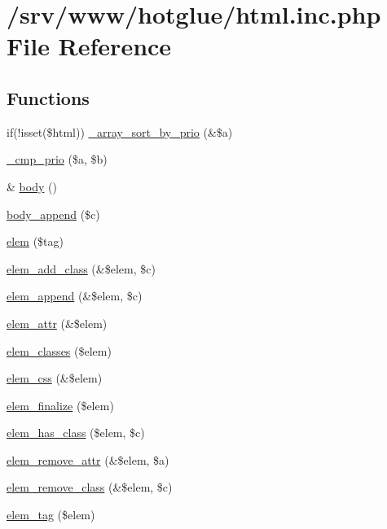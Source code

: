 \hypertarget{html_8inc_8php}{
\section{/srv/www/hotglue/html.inc.php File Reference}
\label{html_8inc_8php}
}
\subsection*{Functions}
\begin{DoxyCompactItemize}
\item 
if(!isset(\$html)) \hyperlink{html_8inc_8php_a7fb2b386b2bae219112628971275c225}{\_\-array\_\-sort\_\-by\_\-prio} (\&\$a)
\item 
\hyperlink{html_8inc_8php_af8ecadff0a4b78867d4da5eae49615e1}{\_\-cmp\_\-prio} (\$a, \$b)
\item 
\& \hyperlink{html_8inc_8php_a8b842636055e9a5853a7a10a9e002330}{body} ()
\item 
\hyperlink{html_8inc_8php_ad27881abf3a2004d287434d8c8d7cdf6}{body\_\-append} (\$c)
\item 
\hyperlink{html_8inc_8php_aa7a1256f84f937f1656195d5ce7b8d91}{elem} (\$tag)
\item 
\hyperlink{html_8inc_8php_aafa12d2b690751666e599fb052e19ca6}{elem\_\-add\_\-class} (\&\$elem, \$c)
\item 
\hyperlink{html_8inc_8php_aea37c451f5d55e2efbb2656e340c1dae}{elem\_\-append} (\&\$elem, \$c)
\item 
\hyperlink{html_8inc_8php_a894dc22f3b7668c59364599909162b8e}{elem\_\-attr} (\&\$elem)
\item 
\hyperlink{html_8inc_8php_a821651b8923938645b0b0fa6bb084522}{elem\_\-classes} (\$elem)
\item 
\hyperlink{html_8inc_8php_ac705ef06deb9e2d49e342ed78ecc1c9a}{elem\_\-css} (\&\$elem)
\item 
\hyperlink{html_8inc_8php_af04b43a4dd09e73ca2cef84a4f2e9381}{elem\_\-finalize} (\$elem)
\item 
\hyperlink{html_8inc_8php_ab1019c4b75181c1c1af10e1c1e5e197d}{elem\_\-has\_\-class} (\$elem, \$c)
\item 
\hyperlink{html_8inc_8php_aeb7074172d9164f69e64967b6bcdc643}{elem\_\-remove\_\-attr} (\&\$elem, \$a)
\item 
\hyperlink{html_8inc_8php_a6a224914e8f32176ca11a31154b1ae13}{elem\_\-remove\_\-class} (\&\$elem, \$c)
\item 
\hyperlink{html_8inc_8php_a158c5e6dccf734bc8c035e6bcd0a446f}{elem\_\-tag} (\$elem)

\end{DoxyCompactItemize}
